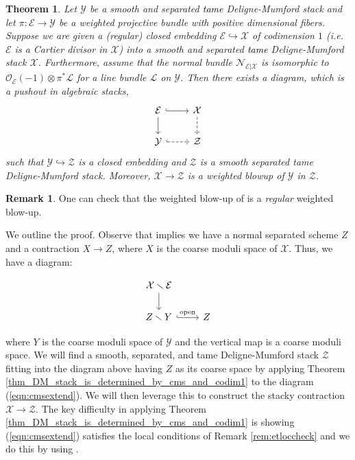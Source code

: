 \documentclass{amsart}
\newcommand{\cE}{\mathcal{E}}
\newcommand{\cL}{\mathcal{L}}
\newcommand{\cN}{\mathcal{N}}
\newcommand{\cO}{\mathcal{O}}
\newcommand{\cX}{\mathcal{X}}
\newcommand{\cY}{\mathcal{Y}}
\newcommand{\cZ}{\mathcal{Z}}
\newtheorem{Teo}[theorem]{Theorem}
\theoremstyle{definition}
\newtheorem{Remark}[theorem]{Remark}
\begin{document}
\begin{Teo}\label{theo:main} 
    Let $\cY$ be a smooth and separated \textcolor{black}{tame} Deligne-Mumford stack  and let $\pi:\cE \rightarrow \cY$ be a weighted projective bundle with positive dimensional fibers. Suppose we are given a (regular) closed embedding $\cE \hookrightarrow \cX$ of codimension $1$ (i.e. $\cE$ is a Cartier divisor in $\cX$) into a smooth and separated \textcolor{black}{tame} Deligne-Mumford stack $\cX$. Furthermore, assume that the normal bundle $\cN_{\cE\vert\cX}$ is isomorphic to $\cO_{\cE}(-1)\otimes \pi^*\cL$ for a line bundle $\cL$ on $\cY$. 
    Then there exists a diagram, which is a pushout in algebraic stacks,
    \begin{equation} \label{eqn:general}
    \begin{tikzcd}
    \cE \arrow[d] \arrow[r, hook] & \cX \arrow[d, dashed] \\
    \cY \arrow[r, dashed, hook]           & \cZ          
    \end{tikzcd}
    \end{equation}
    such that $\cY\hookrightarrow \cZ$ is a closed embedding and $\cZ$ is a smooth separated tame Deligne-Mumford stack. Moreover, $\cX \rightarrow \cZ$ is a weighted blowup of $\cY$ in $\cZ$.
    \end{Teo}
    \begin{Remark}
    One can check that the weighted blow-up of  is a \textit{regular} weighted blow-up.
\end{Remark}
    
We outline the proof. Observe that  implies we have a normal separated scheme $Z$ and a contraction $X\to Z$, where $X$ is the coarse moduli space of $\cX$. Thus, we have a diagram:\begin{center}\begin{equation}
\label{eqn:cmsextend}
    \begin{tikzcd}
    \cX \smallsetminus \cE \arrow[d] &  \\
    Z \smallsetminus Y \arrow[r, hook, "\mathrm{open}"]   & Z          \end{tikzcd}
    \end{equation}
    \end{center}
where $Y$ is the coarse moduli space of $\cY$ and the vertical map is a coarse moduli space. We will find a smooth, separated, and tame Deligne-Mumford stack $\cZ$ fitting into the diagram above having $Z$ as its coarse space by applying Theorem \ref{thm_DM_stack_is_determined_by_cms_and_codim1} to the diagram (\ref{eqn:cmsextend}). We will then leverage this to construct the stacky contraction $\cX\to\cZ$. The key difficulty in applying Theorem \ref{thm_DM_stack_is_determined_by_cms_and_codim1} is showing (\ref{eqn:cmsextend}) satisfies the local conditions of Remark \ref{rem:etloccheck} and we do this by using .
\end{document}
